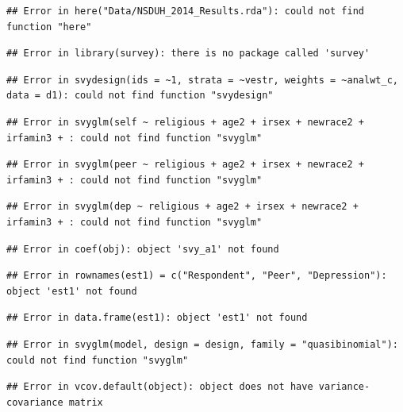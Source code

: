 \documentclass[]{DissertateUSU}
\begin{document}
\begin{verbatim}
## Error in here("Data/NSDUH_2014_Results.rda"): could not find function "here"
\end{verbatim}

\begin{verbatim}
## Error in library(survey): there is no package called 'survey'
\end{verbatim}

\begin{verbatim}
## Error in svydesign(ids = ~1, strata = ~vestr, weights = ~analwt_c, data = d1): could not find function "svydesign"
\end{verbatim}

\begin{verbatim}
## Error in svyglm(self ~ religious + age2 + irsex + newrace2 + irfamin3 + : could not find function "svyglm"
\end{verbatim}

\begin{verbatim}
## Error in svyglm(peer ~ religious + age2 + irsex + newrace2 + irfamin3 + : could not find function "svyglm"
\end{verbatim}

\begin{verbatim}
## Error in svyglm(dep ~ religious + age2 + irsex + newrace2 + irfamin3 + : could not find function "svyglm"
\end{verbatim}

\begin{verbatim}
## Error in coef(obj): object 'svy_a1' not found
\end{verbatim}

\begin{verbatim}
## Error in rownames(est1) = c("Respondent", "Peer", "Depression"): object 'est1' not found
\end{verbatim}

\begin{verbatim}
## Error in data.frame(est1): object 'est1' not found
\end{verbatim}

\begin{verbatim}
## Error in svyglm(model, design = design, family = "quasibinomial"): could not find function "svyglm"
\end{verbatim}

\begin{verbatim}
## Error in vcov.default(object): object does not have variance-covariance matrix
\end{verbatim}
\end{document}
